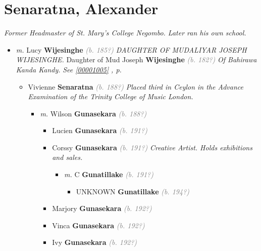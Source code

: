 \documentclass[10pt, openany]{book}
\begin{document}
\chapter{Senaratna, Alexander}
\label{00000704}
\textcolor{slmaroon}{\textit{Former Headmaster of St. Mary's College Negombo. Later ran his own school.}}
\begin{itemize}
\item{\textit{m.} Lucy \textbf{Wijesinghe} \textcolor{gray}{\textit{(b. 185?)}} \textcolor{slmaroon}{\textit{DAUGHTER OF MUDALIYAR JOSEPH WIJESINGHE.}} Daughter of  Mud Joseph \textbf{Wijesinghe} \textcolor{gray}{\textit{(b. 182?)}} \textcolor{slmaroon}{\textit{Of Bahirawa Kanda Kandy.}} \textcolor{slteal}{\textit{See  \autoref{00001005} \textit{, p. \pageref{00001005} }}}   \label{couple:00000704:00001003} \begin{itemize}
\item{Vivienne \textbf{Senaratna} \textcolor{gray}{\textit{(b. 188?)}} \textcolor{slmaroon}{\textit{Placed third in Ceylon in the Advance Examination of the Trinity College of Music London.}}
\begin{itemize}
\item{\textit{m.} Wilson \textbf{Gunasekara} \textcolor{gray}{\textit{(b. 188?)}}   \label{couple:00000229:00000779} \begin{itemize}
\item{Lucien \textbf{Gunasekara} \textcolor{gray}{\textit{(b. 191?)}}
 }
\item{Corssy \textbf{Gunasekara} \textcolor{gray}{\textit{(b. 191?)}} \textcolor{slmaroon}{\textit{Creative Artist. Holds exhibitions and sales.}}
\begin{itemize}
\item{\textit{m.} C \textbf{Gunatillake} \textcolor{gray}{\textit{(b. 191?)}}   \label{couple:00000211:00000237} \begin{itemize}
\item{UNKNOWN \textbf{Gunatillake} \textcolor{gray}{\textit{(b. 194?)}}
 }
\end{itemize}}
\end{itemize}
 }
\item{Marjory \textbf{Gunasekara} \textcolor{gray}{\textit{(b. 192?)}}
 }
\item{Vinca \textbf{Gunasekara} \textcolor{gray}{\textit{(b. 192?)}}
 }
\item{Ivy \textbf{Gunasekara} \textcolor{gray}{\textit{(b. 192?)}}
}
\end{itemize}}
\end{itemize}}
\end{itemize}}
\end{itemize}
\end{document}
